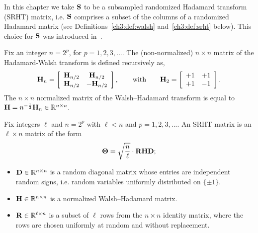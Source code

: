 In this chapter we take $\mathbf{S}$ to be a subsampled randomized Hadamard
transform (SRHT) matrix, i.e. $\mathbf{S}$ comprises a subset of the columns of a 
randomized Hadamard matrix (see Definitions~\ref{ch3:def:walsh} and~\ref{ch3:def:srht} below).
This choice for $\mathbf{S}$ was introduced in~\cite{AC06}.

\begin{defn}
\label{ch3:def:walsh}
Fix an integer $n = 2^p$, for $p = 1,2,3, ...$. The (non-normalized) $n \times n$ matrix of the Hadamard-Walsh transform is defined recursively as,
\vspace{-.0751in}
%
$$ \matH_n = \left[
\begin{array}{cc}
  \matH_{n/2} &  \matH_{n/2} \\
  \matH_{n/2} & -\matH_{n/2}
\end{array}\right],
%
\qquad \mbox{with} \qquad
%
\matH_2 = \left[
\begin{array}{cc}
  +1 & +1 \\
  +1 & -1
\end{array}\right].
$$
%
The $n \times n$ normalized matrix of the Walsh--Hadamard transform is equal to $\mathbf{H} = n^{-\frac{1}{2}} \mathbf{H}_n \in \mathbb{R}^{n \times n}.$
\end{defn}

\begin{defn}
\label{ch3:def:srht}

Fix integers $\ell$ and $n = 2^p$ with $\ell < n$ and $p = 1,2,3, ...$. 
An SRHT matrix is an $\ell \times n$ matrix of the form 
$$ \mathbf{\Theta} = \sqrt{\frac{n}{\ell}} \cdot \mathbf{R} \mathbf{H}  \mathbf{D};$$
\begin{itemize}
\item $\mathbf{D} \in \mathbb{R}^{n \times n}$ is a random diagonal matrix whose entries 
are independent random signs, i.e. random variables uniformly distributed on $\{\pm 1\}$.
\item $\mathbf{H} \in \mathbb{R}^{n \times n}$ is a normalized Walsh--Hadamard matrix.
\item $\mathbf{R} \in \mathbb{R}^{\ell \times n}$ is a subset of $\ell$ rows from the $n \times n$ 
identity matrix, where the rows are  chosen uniformly at random and without replacement.
\end{itemize}
\end{defn}


